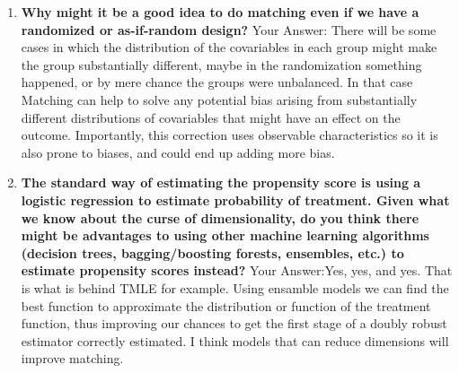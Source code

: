\documentclass[
]{article}
\begin{document}
\begin{enumerate}
    \item \textbf{Why might it be a good idea to do matching even if we have a randomized or as-if-random design?}
    Your Answer: There will be some cases in which the distribution of the covariables in each group might make the group substantially different, maybe in the randomization something happened, or by mere chance the groups were unbalanced. In that case Matching can help to solve any potential bias arising from substantially different distributions of covariables that might have an effect on the outcome. Importantly, this correction uses observable characteristics so it is also prone to biases, and could end up adding more bias. 
    \item \textbf{The standard way of estimating the propensity score is using a logistic regression to estimate probability of treatment. Given what we know about the curse of dimensionality, do you think there might be advantages to using other machine learning algorithms (decision trees, bagging/boosting forests, ensembles, etc.) to estimate propensity scores instead?}
    Your Answer:Yes, yes, and yes. That is what is behind TMLE for example. Using ensamble models we can find the best function to approximate the distribution or function of the treatment function, thus improving our chances to get the first stage of a doubly robust estimator correctly estimated. I think models that can reduce dimensions will improve matching. 
    
    
\end{enumerate}
\end{document}
